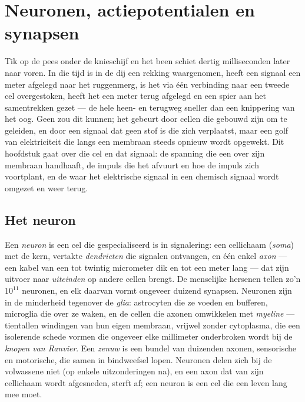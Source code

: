 \chapter{Neuronen, actiepotentialen en synapsen}\label{ch:b2:neurons-synapses}

Tik op de pees onder de knieschijf en het been schiet dertig milliseconden
later naar voren. In die tijd is in de dij een rekking waargenomen, heeft
een signaal een meter afgelegd naar het ruggenmerg, is het via één
verbinding naar een tweede cel overgestoken, heeft het een meter terug
afgelegd en een spier aan het samentrekken gezet --- de hele heen- en
terugweg sneller dan een knippering van het oog. Geen  zou dit
kunnen; het gebeurt door cellen die gebouwd zijn om te geleiden, en door een
signaal dat geen stof is die zich verplaatst, maar een golf van elektriciteit
die langs een membraan steeds opnieuw wordt opgewekt. Dit hoofdstuk gaat over
die cel en dat signaal: de spanning die een  over zijn membraan
handhaaft, de impuls die het afvuurt en hoe de impuls zich voortplant, en de
 waar het elektrische signaal in een chemisch signaal wordt omgezet en
weer terug.

\section{Het neuron}

\begin{definition}\label{def:b2:neurons-synapses:neuron}
Een \emph{neuron} is een cel die gespecialiseerd is in signalering: een
cellichaam (\emph{soma}) met de kern, vertakte \emph{dendrieten} die
signalen ontvangen, en één enkel \emph{axon} --- een kabel van een tot twintig
micrometer dik en tot een meter lang --- dat zijn uitvoer naar
\emph{uiteinden} op andere cellen brengt. De menselijke hersenen tellen zo'n
$10^{11}$ neuronen, en elk daarvan vormt ongeveer duizend synapsen. Neuronen
zijn in de minderheid tegenover de \emph{glia}: astrocyten die ze voeden en
bufferen, microglia die over ze waken, en de cellen die axonen omwikkelen met
\emph{myeline} --- tientallen windingen van hun eigen membraan, vrijwel
zonder cytoplasma, die een isolerende schede vormen die ongeveer elke
millimeter onderbroken wordt bij de \emph{knopen van Ranvier}. Een
\emph{zenuw} is een bundel van duizenden axonen, sensorische en motorische,
die samen in bindweefsel lopen. Neuronen delen zich bij de volwassene niet
(op enkele uitzonderingen na), en een axon dat van zijn cellichaam wordt
afgesneden, sterft af; een neuron is een cel die een leven lang mee moet.
\end{definition}

